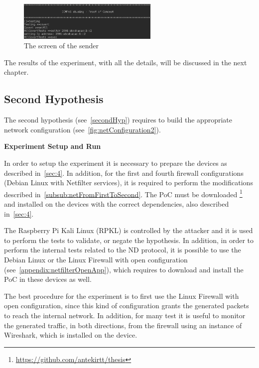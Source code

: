 \documentclass[12pt]{article}
\begin{document}
\begin{figure}[ht] 
\begin{center}
\includegraphics[width=0.6\textwidth]{runExpSender}
\caption{The screen of the sender}
\label{fig:runExpSend}
\end{center}
\end{figure}

The results of the experiment, with all the details, will be discussed in the next chapter.

\subsection{Second Hypothesis}
\label{sub:secondHypExp}

The second hypothesis (see~\ref{secondHyp}) requires to build the appropriate network configuration (see~\cref{fig:netConfiguration2}).

\textbf{Experiment Setup and Run}
\label{subsub:expRun2}

In order to setup the experiment it is necessary to prepare the devices as described in~\cref{sec:4}. In addition, for the first and fourth firewall configurations (Debian Linux with Netfilter services), it is required to perform the modifications described in~\cref{subsub:netFromFirstToSecond}. The PoC must be downloaded \footnote{\url{https://github.com/antekirtt/thesis}} and installed on the devices with the correct dependencies, also described in~\cref{sec:4}.

The Raspberry Pi Kali Linux (RPKL) is controlled by the attacker and it is used to perform the tests to validate, or negate the hypothesis. In addition, in order to perform the internal tests related to the ND protocol, it is possible to use the Debian Linux or the Linux Firewall with open configuration (see~\cref{appendix:netfilterOpenApp}), which requires to download and install the PoC in these devices as well.

The best procedure for the experiment is to first use the Linux Firewall with open configuration, since this kind of configuration grants the generated packets to reach the internal network. In addition, for many test it is useful to monitor the generated traffic, in both directions, from the firewall using an instance of Wireshark, which is installed on the device.
\end{document}
